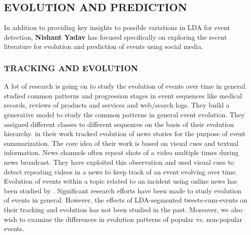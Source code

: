 \subsection{\uppercase{Evolution and Prediction}}
In addition to providing key insights to possible variations in LDA for event detection, {\bf Nishant Yadav} has focused specifically on exploring the recent literature for evolution and prediction of events using social media.

\subsubsection{\uppercase{Tracking and Evolution}}
A lot of research is going on to study the evolution of events over time in general. \cite{yang2014finding} studied common patterns and progression stages in event sequences like medical records, reviews of products and services and web/search logs. They build a generative model to study the common patterns in general event evolution. They assigned different classes to different sequences on the basis of their evolution hierarchy. \cite{duygulu2004towards} in their work tracked evolution of news stories for the purpose of event summarization. The core idea of their work is based on visual cues and textual information. News channels often repeat shots of a video multiple times during news broadcast. They have exploited this observation and used visual cues to detect repeating videos in a news to keep track of an event evolving over time. Evolution of events within a topic related to an incident using online news has been studied by \cite{yang2009discovering}. Significant research efforts have been made to study evolution of events in general. However, the effects of LDA-segmented tweets-cum-events on their tracking and evolution has not been studied in the past. Moreover, we also wish to examine the differences in evolution patterns of popular vs. non-popular events.

